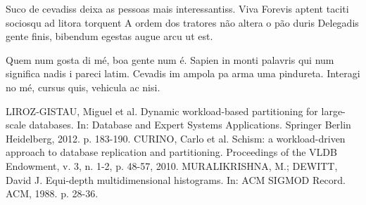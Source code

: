 \documentclass[portrait,a0]{a0poster}
\begin{document}
\begin{multicols}{2}
Suco de cevadiss deixa as pessoas mais interessantiss. Viva Forevis aptent taciti sociosqu ad litora torquent A ordem dos tratores não altera o pão duris Delegadis gente finis, bibendum egestas augue arcu ut est.

Quem num gosta di mé, boa gente num é. Sapien in monti palavris qui num significa nadis i pareci latim. Cevadis im ampola pa arma uma pindureta. Interagi no mé, cursus quis, vehicula ac nisi.

\begin{thebibliography}{9}
 LIROZ-GISTAU, Miguel et al. Dynamic workload-based partitioning for large-scale databases. In: Database and Expert Systems Applications. Springer Berlin Heidelberg, 2012. p. 183-190.
 CURINO, Carlo et al. Schism: a workload-driven approach to database replication and partitioning. Proceedings of the VLDB Endowment, v. 3, n. 1-2, p. 48-57, 2010.
 MURALIKRISHNA, M.; DEWITT, David J. Equi-depth multidimensional histograms. In: ACM SIGMOD Record. ACM, 1988. p. 28-36.
\end{thebibliography}


\end{multicols}
\makefooter
\end{document}
